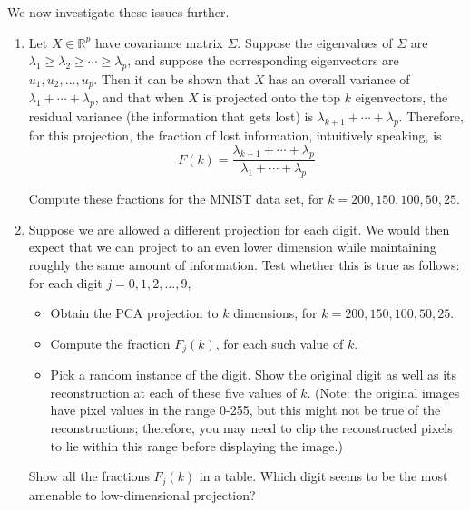 \documentclass[10pt]{report}
\theoremstyle{plain}
\theoremstyle{definition}
\newcommand{\R}{\mathbb{R}}
\begin{document}
\begin{enumerate}
We now investigate these issues further.
\begin{enumerate}
\item Let $X \in \R^p$ have covariance matrix $\Sigma$. Suppose the eigenvalues of $\Sigma$ are $\lambda_1 \geq \lambda_2 \geq \cdots \geq \lambda_p$, and suppose the corresponding eigenvectors are $u_1, u_2, \ldots, u_p$. Then it can be shown that $X$ has an overall variance of $\lambda_1 + \cdots + \lambda_p$, and that when $X$ is projected onto the top $k$ eigenvectors, the residual variance (the information that gets lost) is $\lambda_{k+1} + \cdots + \lambda_p$. Therefore, for this projection, the fraction of lost information, intuitively speaking, is
  $$ F(k) = \frac{\lambda_{k+1} + \cdots + \lambda_p}{\lambda_1 + \cdots + \lambda_p} $$

Compute these fractions for the MNIST data set, for $k = 200, 150, 100, 50, 25$.

\item Suppose we are allowed a different projection for each digit. We would then expect that we can project to an even lower dimension while maintaining roughly the same amount of information. Test whether this is true as follows: for each digit $j = 0, 1, 2, \ldots, 9$,
\begin{itemize}
\item Obtain the PCA projection to $k$ dimensions, for $k = 200, 150, 100, 50, 25$.
\item Compute the fraction $F_j(k)$, for each such value of $k$.
\item Pick a random instance of the digit. Show the original digit as well as its reconstruction at each of these five values of $k$. (Note: the original images have pixel values in the range 0-255, but this might not be true of the reconstructions; therefore, you may need to clip the reconstructed pixels to lie within this range before displaying the image.)
\end{itemize}
Show all the fractions $F_j(k)$ in a table. Which digit seems to be the most amenable to low-dimensional projection?
\end{enumerate}

\end{enumerate}
\end{document}
